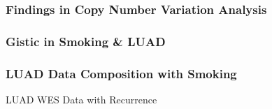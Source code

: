 \documentclass{beamer}
\begin{document}
    \begin{frame}
        \frametitle{Findings in Copy Number Variation Analysis}
    \end{frame}

    \subsubsection{Gistic in Smoking \& LUAD}
    \begin{frame}
        \frametitle{LUAD Data Composition with Smoking}

        \begin{table}
            \caption{LUAD WES Data with Recurrence}
            \resizebox{!}{0.3 \textheight}
            {}
        \end{table}
    \end{frame}
\end{document}
